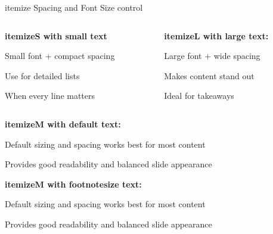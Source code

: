 \documentclass[11pt,compress,t,notes=noshow, xcolor=table]{beamer}
\begin{document}
\begin{frame}{itemize Spacing and Font Size control}
  
  \begin{columns}[T]
    \begin{column}{0.48\textwidth}
      \textbf{itemizeS with small text}
      \begin{itemizeS}[small]
        \item Small font + compact spacing
        \item Use for detailed lists
        \item When every line matters
      \end{itemizeS}
    \end{column}
    
    \begin{column}{0.48\textwidth}
      \textbf{itemizeL with large text:}
      \begin{itemizeL}[large]
        \item Large font + wide spacing
        \item Makes content stand out
        \item Ideal for takeaways
      \end{itemizeL}
    \end{column}
  \end{columns}
  
  \vfill
  
  \textbf{itemizeM with default text:}
  \begin{itemizeM}
    \item Default sizing and spacing works best for most content
    \item Provides good readability and balanced slide appearance
  \end{itemizeM}
  
  \vfill
  
  \textbf{itemizeM with footnotesize text:}
  \begin{itemizeM}[footnotesize]
    \item Default sizing and spacing works best for most content
    \item Provides good readability and balanced slide appearance
  \end{itemizeM}
  
\end{frame}

\end{document}

